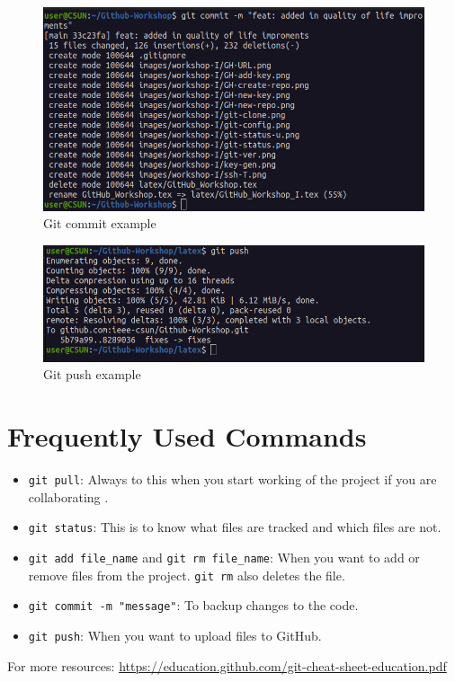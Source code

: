 \documentclass[12pt, a4paper]{article}
\begin{document}
\begin{figure}[H]
\centering
\includegraphics[scale=0.5]{../images/workshop-I/git-commit.png}
\caption{Git commit example}
\end{figure}

\begin{figure}[H]
\centering
\includegraphics[scale=0.5]{../images/workshop-I/git-push.png}
\caption{Git push example}
\end{figure}

\section{Frequently Used Commands}
\begin{itemize}
    \item \verb`git pull`: Always to this when you start working of the project if you are collaborating .
    \item \verb`git status`: This is to know what files are tracked and which files are not.
    \item \verb`git add file_name` and \verb`git rm file_name`: When you want to add or remove files from the project. \verb`git rm` also deletes the file.
    \item \verb`git commit -m "message"`: To backup changes to the code.
    \item \verb`git push`: When you want to upload files to GitHub.
\end{itemize}
For more resources: \url{https://education.github.com/git-cheat-sheet-education.pdf}
\clearpage
\end{document}
